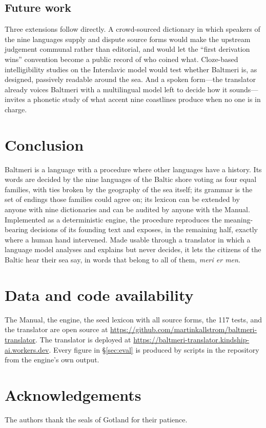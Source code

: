 \subsection{Future work}
Three extensions follow directly. A crowd-sourced dictionary in which speakers of the nine languages supply and dispute source forms would make the upstream judgement communal rather than editorial, and would let the ``first derivation wins'' convention become a public record of who coined what. Cloze-based intelligibility studies on the Interslavic model would test whether Baltmeri is, as designed, passively readable around the sea. And a spoken form---the translator already voices Baltmeri with a multilingual model left to decide how it sounds---invites a phonetic study of what accent nine coastlines produce when no one is in charge.

\section{Conclusion}
Baltmeri is a language with a procedure where other languages have a history. Its words are decided by the nine languages of the Baltic shore voting as four equal families, with ties broken by the geography of the sea itself; its grammar is the set of endings those families could agree on; its lexicon can be extended by anyone with nine dictionaries and can be audited by anyone with the Manual. Implemented as a deterministic engine, the procedure reproduces the meaning-bearing decisions of its founding text and exposes, in the remaining half, exactly where a human hand intervened. Made usable through a translator in which a language model analyses and explains but never decides, it lets the citizens of the Baltic hear their sea say, in words that belong to all of them, \emph{meri er men}.

\section*{Data and code availability}
The Manual, the engine, the seed lexicon with all source forms, the 117 tests, and the translator are open source at \url{https://github.com/martinkallstrom/baltmeri-translator}. The translator is deployed at \url{https://baltmeri-translator.kindship-ai.workers.dev}. Every figure in \S\ref{sec:eval} is produced by scripts in the repository from the engine's own output.

\section*{Acknowledgements}
The authors thank the seals of Gotland for their patience.
